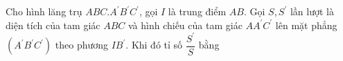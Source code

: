 \begin{ex}
Cho hình lăng trụ $ABC.A^{\prime}B^{\prime}C^{\prime}$, gọi $I$ là trung điểm $AB$. Gọi $S,S^{\prime}$ lần lượt là diện tích của tam giác $ABC$ và hình chiếu của tam giác $AA^{\prime}C^{\prime}$ lên mặt phẳng $(A^{\prime}B^{\prime}C^{\prime})$ theo phương $IB^{\prime}$. Khi đó tỉ số $\dfrac{S^{\prime}}S$ bằng
\end{ex}
